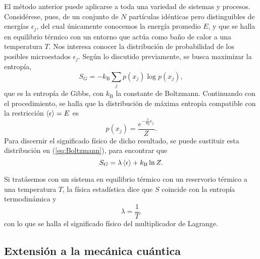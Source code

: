 El método anterior puede aplicarse a toda una variedad de sistemas y procesos. Considérese, pues, de un conjunto de $N$ partículas idénticas pero distinguibles de energías $\epsilon_{j}$, del cual únicamente conocemos la energía promedio $E$, y que se halla en equilibrio térmico con un entorno que actúa como baño de calor a una temperatura $T$. Nos interesa conocer la distribución de probabilidad de los posibles microestados $\epsilon_{j}$. Según lo discutido previamente, se busca maximizar la entropía,
\begin{equation}\label{eq:GibbsEntropy}
    S_{G}=-k_{\text{B}}\sum_{j}p(x_{j})\log{p(x_{j})},
\end{equation}
que es la entropía de Gibbs, con $k_{\text{B}}$ la constante de Boltzmann. Continuando con el procedimiento, se halla que la distribución de máxima entropía compatible con la restricción $\expval{\epsilon}=E$ es
\begin{equation}\label{eq:Boltzmann}
    p(x_{j})=\frac{e^{-\frac{\lambda}{k_{\text{B}}}\epsilon_{j}}}{Z}.
\end{equation}
Para discernir el significado físico de dicho resultado, se puede sustituir esta distribución en (\ref{eq:Boltzmann}), para encontrar que
\begin{equation}
    S_{G}=\lambda\expval{\epsilon}+k_{\text{B}}\ln{Z}.
\end{equation}

Si tratásemos con un sistema en equilibrio térmico con un reservorio térmico a una temperatura $T$, la física estadística dice que $S$ coincide con la entropía termodinámica y
\begin{equation}
    \lambda=\frac{1}{T}.\nonumber
\end{equation}
con lo que se halla el significado físico del multiplicador de Lagrange. \cite{Greiner}

\subsection{Extensión a la mecánica cuántica}


